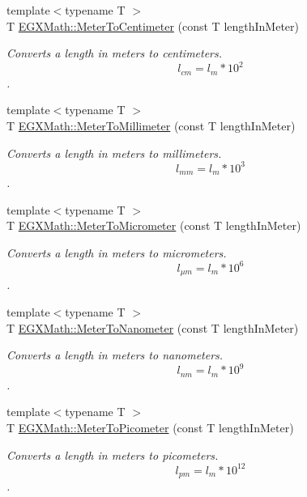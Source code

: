 \begin{DoxyCompactItemize}
{\footnotesize template$<$typename T $>$ }\\T \mbox{\hyperlink{group___e_g_x_math-_conversions-_length_conversions-_s_i-_meter-_s_i_gab70c34d0ee4bf48225d48e48b28f808a}{E\+G\+X\+Math\+::\+Meter\+To\+Centimeter}} (const T length\+In\+Meter)
\begin{DoxyCompactList}\small\item\em Converts a length in meters to centimeters. \[ l_{cm}=l_{m} * 10^{2} \]. \end{DoxyCompactList}\item 
{\footnotesize template$<$typename T $>$ }\\T \mbox{\hyperlink{group___e_g_x_math-_conversions-_length_conversions-_s_i-_meter-_s_i_ga9bd519d9f6b1a52f85e7817f4f81690b}{E\+G\+X\+Math\+::\+Meter\+To\+Millimeter}} (const T length\+In\+Meter)
\begin{DoxyCompactList}\small\item\em Converts a length in meters to millimeters. \[ l_{mm}=l_{m} * 10^{3} \]. \end{DoxyCompactList}\item 
{\footnotesize template$<$typename T $>$ }\\T \mbox{\hyperlink{group___e_g_x_math-_conversions-_length_conversions-_s_i-_meter-_s_i_gac0114c26af780ce603948df83f5e338e}{E\+G\+X\+Math\+::\+Meter\+To\+Micrometer}} (const T length\+In\+Meter)
\begin{DoxyCompactList}\small\item\em Converts a length in meters to micrometers. \[ l_{\mu m}=l_{m} * 10^{6} \]. \end{DoxyCompactList}\item 
{\footnotesize template$<$typename T $>$ }\\T \mbox{\hyperlink{group___e_g_x_math-_conversions-_length_conversions-_s_i-_meter-_s_i_gad3532cd9d0a9b97ae34aadc0eea27c57}{E\+G\+X\+Math\+::\+Meter\+To\+Nanometer}} (const T length\+In\+Meter)
\begin{DoxyCompactList}\small\item\em Converts a length in meters to nanometers. \[ l_{nm}=l_{m} * 10^{9} \]. \end{DoxyCompactList}\item 
{\footnotesize template$<$typename T $>$ }\\T \mbox{\hyperlink{group___e_g_x_math-_conversions-_length_conversions-_s_i-_meter-_s_i_ga5e136454c20254062d6e8637cfbfb8ee}{E\+G\+X\+Math\+::\+Meter\+To\+Picometer}} (const T length\+In\+Meter)
\begin{DoxyCompactList}\small\item\em Converts a length in meters to picometers. \[ l_{pm}=l_{m} * 10^{12} \]. \end{DoxyCompactList}\item 

\end{DoxyCompactItemize}
